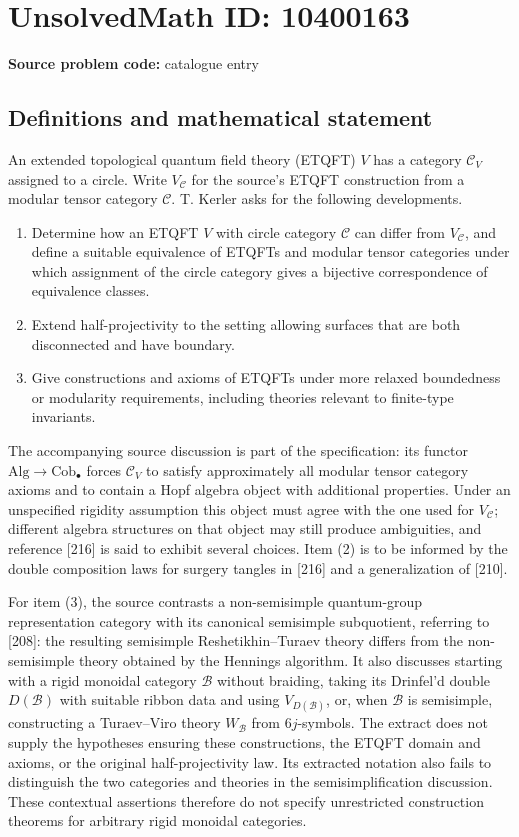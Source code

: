 \documentclass[11pt]{article}
\begin{document}
\section*{UnsolvedMath ID: 10400163}
\textbf{Source problem code:} catalogue entry
\subsection{Definitions and mathematical statement}
An extended topological quantum field theory (ETQFT) \(V\) has a category \(\mathcal C_V\) assigned to a circle. Write \(V_{\mathcal C}\) for the source's ETQFT construction from a modular tensor category \(\mathcal C\). T. Kerler asks for the following developments.
\begin{enumerate}
\item Determine how an ETQFT \(V\) with circle category \(\mathcal C\) can differ from \(V_{\mathcal C}\), and define a suitable equivalence of ETQFTs and modular tensor categories under which assignment of the circle category gives a bijective correspondence of equivalence classes.
\item Extend half-projectivity to the setting allowing surfaces that are both disconnected and have boundary.
\item Give constructions and axioms of ETQFTs under more relaxed boundedness or modularity requirements, including theories relevant to finite-type invariants.
\end{enumerate}
The accompanying source discussion is part of the specification: its functor \(\mathrm{Alg}\to\mathrm{Cob}_{\bullet}\) forces \(\mathcal C_V\) to satisfy approximately all modular tensor category axioms and to contain a Hopf algebra object with additional properties. Under an unspecified rigidity assumption this object must agree with the one used for \(V_{\mathcal C}\); different algebra structures on that object may still produce ambiguities, and reference [216] is said to exhibit several choices. Item (2) is to be informed by the double composition laws for surgery tangles in [216] and a generalization of [210].

For item (3), the source contrasts a non-semisimple quantum-group representation category with its canonical semisimple subquotient, referring to [208]: the resulting semisimple Reshetikhin--Turaev theory differs from the non-semisimple theory obtained by the Hennings algorithm. It also discusses starting with a rigid monoidal category \(\mathcal B\) without braiding, taking its Drinfel'd double \(D(\mathcal B)\) with suitable ribbon data and using \(V_{D(\mathcal B)}\), or, when \(\mathcal B\) is semisimple, constructing a Turaev--Viro theory \(W_{\mathcal B}\) from \(6j\)-symbols. The extract does not supply the hypotheses ensuring these constructions, the ETQFT domain and axioms, or the original half-projectivity law. Its extracted notation also fails to distinguish the two categories and theories in the semisimplification discussion. These contextual assertions therefore do not specify unrestricted construction theorems for arbitrary rigid monoidal categories.
\end{document}
